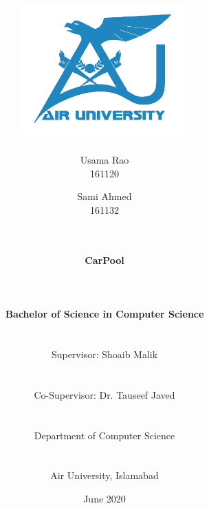 \documentclass[12pt,a4paper]{report}
\begin{document}

\title{\includegraphics[width=0.5\textwidth]{AU-Logo.png}\\}

\author{
	Usama Rao \\ 161120 \and
	
	Sami Ahmed \\ 161132  \and
	
	\\\\
	
	\textbf{\Large CarPool}
	
	\\\\\\
	
	\textbf{\large Bachelor of Science in Computer Science}
	
	\\\\
	
	{\normalsize Supervisor: Shoaib Malik}
	
	\\\\
	
	{\normalsize Co-Supervisor: Dr. Tauseef Javed}
	
	\\\\
	
	{\normalsize Department of Computer Science}
	
	\\\\
	
	{\normalsize Air University, Islamabad}
	
	\date{\normalsize June 2020}
}

\maketitle

\thispagestyle{empty}
\end{document}
